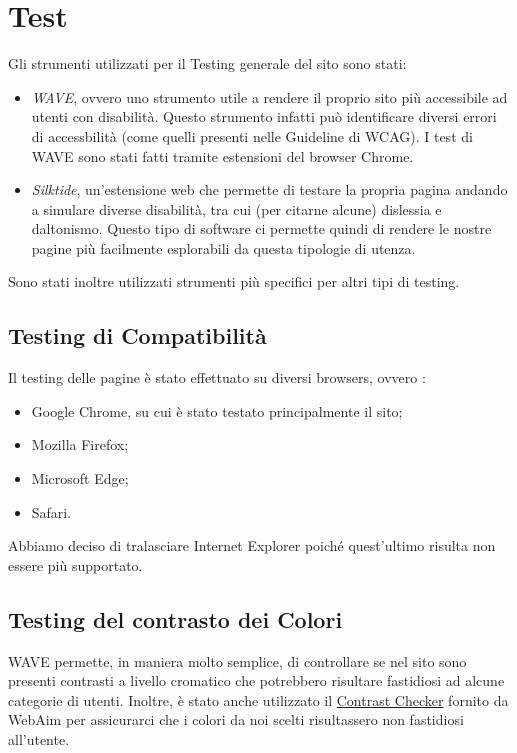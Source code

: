 \section{Test}

  Gli strumenti utilizzati per il Testing generale del sito sono stati:
  \begin{itemize}
    \item \textit{WAVE}, ovvero uno strumento utile a rendere il proprio sito più accessibile ad utenti con disabilità. Questo strumento infatti può identificare diversi errori di accessbilità (come quelli presenti nelle Guideline di WCAG). I test di WAVE sono stati fatti tramite estensioni del browser Chrome.
    \item \textit{Silktide}, un'estensione web che permette di testare la propria pagina andando a simulare diverse disabilità, tra cui (per citarne alcune) dislessia e daltonismo. Questo tipo di software ci permette quindi di rendere le nostre pagine più facilmente esplorabili da questa tipologie di utenza.
  \end{itemize}
  Sono stati inoltre utilizzati strumenti più specifici per altri tipi di testing.
	
  \subsection{Testing di Compatibilità}
    Il testing delle pagine è stato effettuato su diversi browsers, ovvero :
    \begin{itemize}
      \item Google Chrome, su cui è stato testato principalmente il sito;
      \item Mozilla Firefox;
      \item  Microsoft Edge;
      \item Safari.
    \end{itemize}
    Abbiamo deciso di tralasciare Internet Explorer poiché quest'ultimo risulta non essere più supportato.

  \subsection{Testing del contrasto dei Colori} 
    WAVE permette, in maniera molto semplice, di controllare se nel sito sono presenti contrasti a livello cromatico che potrebbero risultare fastidiosi ad alcune categorie di utenti.
    Inoltre, è stato anche utilizzato il \href{https://webaim.org/resources/contrastchecker/}{Contrast Checker} fornito da WebAim per assicurarci che i colori da noi scelti risultassero non fastidiosi all'utente.

